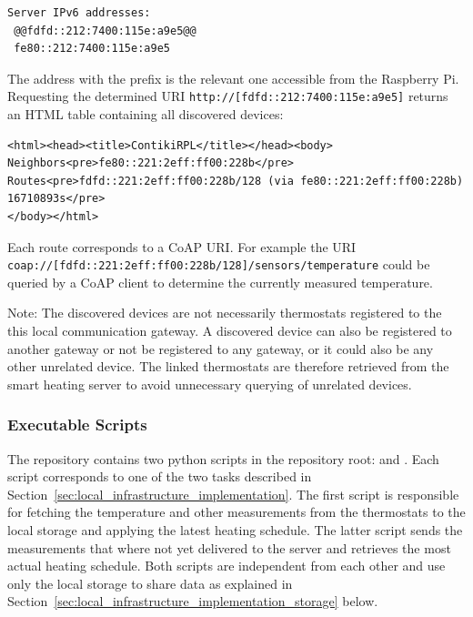 \begin{lstlisting}[numbers=none, moredelim={[is][keywordstyle]{@@}{@@}}]
Server IPv6 addresses:
 @@fdfd::212:7400:115e:a9e5@@
 fe80::212:7400:115e:a9e5
\end{lstlisting}

The address with the prefix  is the relevant one accessible from the Raspberry Pi.
Requesting the determined URI \nolinkurl{http://[fdfd::212:7400:115e:a9e5]} returns an HTML table containing all discovered devices:

\noindent
\begin{minipage}{\linewidth}
\begin{lstlisting}[numbers=none]
<html><head><title>ContikiRPL</title></head><body>
Neighbors<pre>fe80::221:2eff:ff00:228b</pre>
Routes<pre>fdfd::221:2eff:ff00:228b/128 (via fe80::221:2eff:ff00:228b) 16710893s</pre>
</body></html>
\end{lstlisting}
\end{minipage}

Each route corresponds to a CoAP URI. For example the URI \nolinkurl{coap://[fdfd::221:2eff:ff00:228b/128]/sensors/temperature} could be queried by a CoAP client to determine the currently measured temperature.

Note: The discovered devices are not necessarily thermostats registered to the this local communication gateway.
A discovered device can also be registered to another gateway or not be registered to any gateway, or it could also be any other unrelated device.
The linked thermostats are therefore retrieved from the smart heating server to avoid unnecessary querying of unrelated devices.


\subsubsection{Executable Scripts}
\label{sec:local_infrastructure_implementation_scripts}

The  repository contains two python scripts in the repository root:  and .
Each script corresponds to one of the two tasks described in Section~\ref{sec:local_infrastructure_implementation}.
The first script is responsible for fetching the temperature and other measurements from the thermostats to the local storage and applying the latest heating schedule.
The latter script sends the measurements that where not yet delivered to the server and retrieves the most actual heating schedule. Both scripts are independent from each other and use only the local storage to share data as explained in Section~\ref{sec:local_infrastructure_implementation_storage} below.

